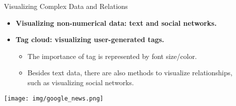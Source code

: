 \begin{frame}{Visualizing Complex Data and Relations}
	\centering
	\begin{itemize}
		\item \textbf{Visualizing non-numerical data: text and social networks.}
		\item \textbf{Tag cloud: visualizing user-generated tags.}
		      \begin{itemize}
			      \item The importance of tag is represented by font size/color.
			      \item Besides text data, there are also methods to visualize relationships, \\ such as visualizing social networks.
		      \end{itemize}
	\end{itemize}
	\texttt{[image: img/google\_news.png]}
\end{frame}
